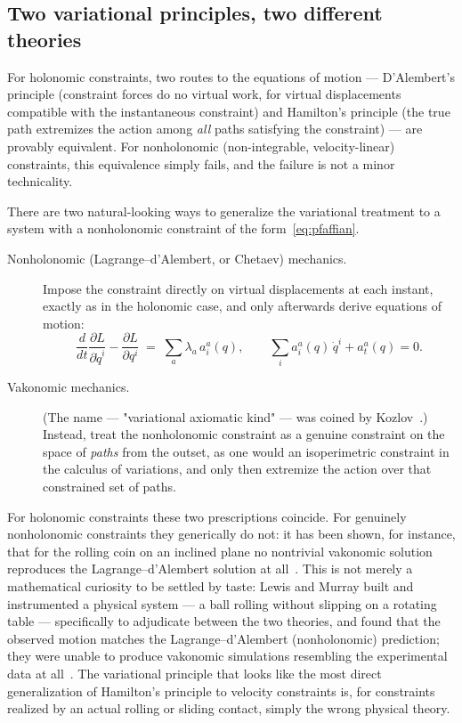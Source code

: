 \subsection{Two variational principles, two different theories}

For holonomic constraints, two routes to the equations of motion ---
D'Alembert's principle (constraint forces do no virtual work, for
virtual displacements compatible with the instantaneous constraint)
and Hamilton's principle (the true path extremizes the action among
\emph{all} paths satisfying the constraint) --- are provably
equivalent. For nonholonomic (non-integrable, velocity-linear)
constraints, this equivalence simply fails, and the failure is not a
minor technicality.

There are two natural-looking ways to generalize the variational
treatment to a system with a nonholonomic constraint of the
form~\eqref{eq:pfaffian}.

\begin{description}
  \item[Nonholonomic (Lagrange--d'Alembert, or Chetaev) mechanics.]
  Impose the constraint directly on virtual displacements at each
  instant, exactly as in the holonomic case, and only afterwards
  derive equations of motion:
  \begin{equation}
    \frac{d}{dt}\frac{\partial L}{\partial \dot q^i}
    - \frac{\partial L}{\partial q^i}
    \;=\; \sum_a \lambda_a\, a_i^a(q),
    \qquad
    \sum_i a_i^a(q)\,\dot q^i + a_t^a(q) = 0 .
    \label{eq:lagrange-dalembert}
  \end{equation}
  \item[Vakonomic mechanics.] (The name --- "variational axiomatic
  kind" --- was coined by Kozlov~\cite{Kozlov1985,VershikFaddeev}.)
  Instead, treat the nonholonomic constraint as a genuine constraint
  on the space of \emph{paths} from the outset, as one would an
  isoperimetric constraint in the calculus of variations, and only
  then extremize the action over that constrained set of paths.
\end{description}

For holonomic constraints these two prescriptions coincide. For
genuinely nonholonomic constraints they generically do not: it has
been shown, for instance, that for the rolling coin on an inclined
plane no nontrivial vakonomic solution reproduces the
Lagrange--d'Alembert solution at
all~\cite{Zampieri2005,ZenkovEtAl2021}. This is not merely a
mathematical curiosity to be settled by taste: Lewis and Murray
built and instrumented a physical system --- a ball rolling without
slipping on a rotating table --- specifically to adjudicate between
the two theories, and found that the observed motion matches the
Lagrange--d'Alembert (nonholonomic) prediction; they were unable to
produce vakonomic simulations resembling the experimental data at
all~\cite{LewisMurray1995}. The variational principle that looks like
the most direct generalization of Hamilton's principle to velocity
constraints is, for constraints realized by an actual rolling or
sliding contact, simply the wrong physical theory.

